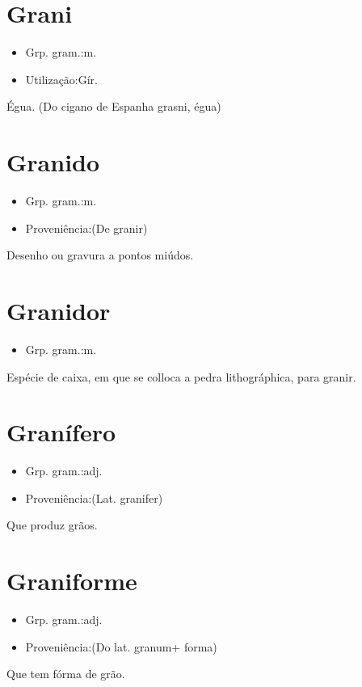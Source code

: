 \section{Grani}
\begin{itemize}
\item {Grp. gram.:m.}
\end{itemize}
\begin{itemize}
\item {Utilização:Gír.}
\end{itemize}
Égua.
(Do cigano de Espanha \textunderscore grasni\textunderscore , égua)
\section{Granido}
\begin{itemize}
\item {Grp. gram.:m.}
\end{itemize}
\begin{itemize}
\item {Proveniência:(De \textunderscore granir\textunderscore )}
\end{itemize}
Desenho ou gravura a pontos miúdos.
\section{Granidor}
\begin{itemize}
\item {Grp. gram.:m.}
\end{itemize}
Espécie de caixa, em que se colloca a pedra lithográphica, para granir.
\section{Granífero}
\begin{itemize}
\item {Grp. gram.:adj.}
\end{itemize}
\begin{itemize}
\item {Proveniência:(Lat. \textunderscore granifer\textunderscore )}
\end{itemize}
Que produz grãos.
\section{Graniforme}
\begin{itemize}
\item {Grp. gram.:adj.}
\end{itemize}
\begin{itemize}
\item {Proveniência:(Do lat. \textunderscore granum\textunderscore  + \textunderscore forma\textunderscore )}
\end{itemize}
Que tem fórma de grão.
